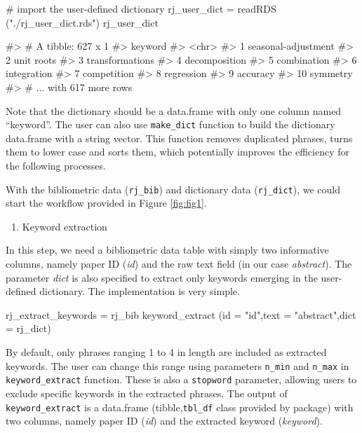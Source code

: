 \begin{Schunk}
\begin{Sinput}
# import the user-defined dictionary
rj_user_dict = readRDS ("./rj_user_dict.rds")
rj_user_dict
\end{Sinput}
\begin{Soutput}
#> # A tibble: 627 x 1
#>    keyword
#>    <chr>
#>  1 seasonal-adjustment
#>  2 unit roots
#>  3 transformations
#>  4 decomposition
#>  5 combination
#>  6 integration
#>  7 competition
#>  8 regression
#>  9 accuracy
#> 10 symmetry
#> # ... with 617 more rows
\end{Soutput}
\end{Schunk}

Note that the dictionary should be a data.frame with only one column
named ``keyword''. The user can also use \texttt{make\_dict} function to
build the dictionary data.frame with a string vector. This function
removes duplicated phrases, turns them to lower case and sorts them,
which potentially improves the efficiency for the following processes.

\begin{Schunk}
\end{Schunk}

With the bibliometric data (\texttt{rj\_bib}) and dictionary data
(\texttt{rj\_dict}), we could start the workflow provided in Figure
\ref{fig:fig1}.

\begin{enumerate}
\def\labelenumi{(\arabic{enumi})}
\tightlist
\item
  Keyword extraction
\end{enumerate}

In this step, we need a bibliometric data table with simply two
informative columns, namely paper ID (\emph{id}) and the raw text field
(in our case \emph{abstract}). The parameter \emph{dict} is also
specified to extract only keywords emerging in the user-defined
dictionary. The implementation is very simple.

\begin{Schunk}
\begin{Sinput}
rj_extract_keywords = rj_bib %>%
  keyword_extract (id = "id",text = "abstract",dict = rj_dict)
\end{Sinput}
\end{Schunk}

By default, only phrases ranging 1 to 4 in length are included as
extracted keywords. The user can change this range using parameters
\texttt{n\_min} and \texttt{n\_max} in \texttt{keyword\_extract}
function. These is also a \texttt{stopword} parameter, allowing users to
exclude specific keywords in the extracted phrases. The output of
\texttt{keyword\_extract} is a data.frame (tibble,\texttt{tbl\_df} class
provided by  package) with two columns, namely paper ID
(\emph{id}) and the extracted keyword (\emph{keyword}).

